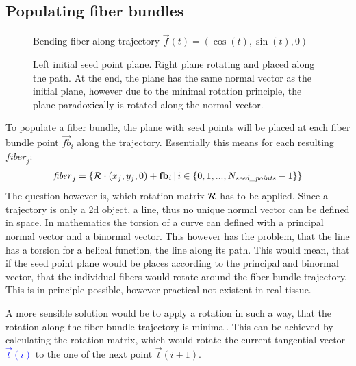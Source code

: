 \subsection{Populating fiber bundles}\label{sec:fillBundle}
%
\begin{figure}[!t]
    \centering
	\caption[Bending filled fiber bundle]{Bending fiber along trajectory $\vec{f}(t) = \left(\cos(t), \sin(t), 0 \right)$ }
	\label{fig:bendingFiberBundle}
\end{figure}
%
\begin{figure}[!t]
    \centering
    \setlength{\tikzwidth}{0.75\textwidth}
	\caption[]{Left initial seed point plane. Right plane rotating and placed along the path. At the end, the plane has the same normal vector as the initial plane, however due to the minimal rotation principle, the plane paradoxically is rotated along the normal vector.}
	\label{fig:torsion}
\end{figure}
%
To populate a fiber bundle, the plane with seed points will be placed at each fiber bundle point $\vec{fb}_i$ along the trajectory.
Essentially this means for each resulting $\mathit{fiber}_j$:
\begin{align}
    \mathit{fiber}_j = \left\{ \mathcal{R} \cdot (x_j, y_j, 0) + \mathbf{fb}_i \, | \, i \in \{0,1,...,N_{\mathit{seed\_points}}-1\}\right\}
\end{align}
The question however is, which rotation matrix $\mathcal{R}$ has to be applied.
Since a trajectory is only a 2d object, \ie{} a line, thus no unique normal vector can be defined in space.
In mathematics the torsion of a curve can defined with a principal normal vector and a binormal vector.
This however has the problem, that the line has a torsion for a helical function, \ie{} the line  along its path.
This would mean, that if the seed point plane would be places according to the principal and binormal vector, that the individual fibers would rotate around the fiber bundle trajectory.
This is in principle possible, however practical not existent in real tissue.
\par
% 
A more sensible solution would be to apply a rotation in such a way, that the rotation along the fiber bundle trajectory is minimal.
This can be achieved by calculating the rotation matrix, which would rotate the current tangential vector \textcolor{BLUE}{$\vec{t}(i)$} to the one of the next point $\vec{t}(i+1)$.
